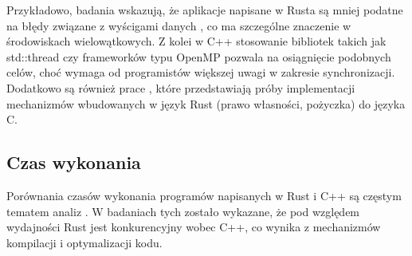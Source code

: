 Przykładowo, badania \cite{RustSafety1, RustSafety2, RustSafety3} wskazują, że aplikacje napisane w Rusta są mniej podatne na błędy związane z wyścigami danych , co ma szczególne znaczenie w środowiskach wielowątkowych. Z kolei w C++ stosowanie bibliotek takich jak std::thread czy frameworków typu OpenMP pozwala na osiągnięcie podobnych celów, choć wymaga od programistów większej uwagi w zakresie synchronizacji. Dodatkowo są również prace \cite{PPL1_1,PPL1_2}, które przedstawiają próby implementacji mechanizmów wbudowanych w język Rust (prawo własności, pożyczka) do języka C.
\subsection{Czas wykonania}
\label{CzasWykonania}
Porównania czasów wykonania programów napisanych w Rust i C++ są częstym tematem analiz \cite{RustPerformance1, RustPerformance2, RustPerformance3, RustPerformance4}. W badaniach tych zostało wykazane, że pod względem wydajności Rust jest konkurencyjny wobec C++, co wynika z mechanizmów kompilacji i optymalizacji kodu.

